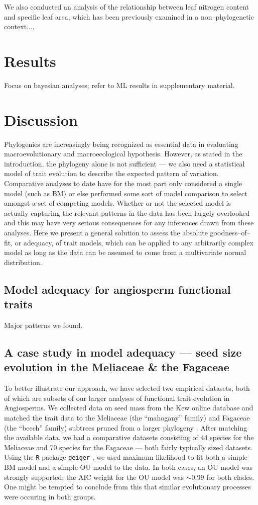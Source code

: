 \documentclass[a4paper,12pt]{article}
\begin{document}
We also conducted an analysis of the relationship between leaf nitrogen content and specific leaf area, which has been previously examined in a non--phylogenetic context....

\section*{Results}

Focus on bayesian analyses; refer to ML results in supplementary material.

\section*{Discussion}

Phylogenies are increasingly being recognized as essential data in evaluating macroevolutionary and macroecological hypothesis. However, as stated in the introduction, the phylogeny alone is not sufficient --- we also need a statistical model of trait evolution to describe the expected pattern of variation. Comparative analyses to date have for the most part only considered a single model (such as BM) or else performed some sort of model comparison to select amongst a set of competing models. Whether or not the selected model is actually capturing the relevant patterns in the data has been largely overlooked and this may have very serious consequences for any inferences drawn from these analyses. Here we present a general solution to assess the absolute goodness--of--fit, or adequacy, of trait models, which can be applied to any arbitrarily complex model as long as the data can be assumed to come from a multivariate normal distribution.

\subsection{Model adequacy for angiosperm functional traits}
Major patterns we found.

\subsection*{A case study in model adequacy --- seed size evolution in the Meliaceae \& the Fagaceae}
To better illustrate our approach, we have selected two empirical datasets, both of which are subsets of our larger analyses of functional trait evolution in Angiosperms. We collected data on seed mass from the Kew online database \citep{Kew2008} and matched the trait data to the Meliaceae (the ``mahogany'' family) and Fagaceae (the ``beech'' family) subtrees pruned from a larger phylogeny \citep{Zanne2013}. After matching the available data, we had a comparative datasets consisting of 44 species for the Meliaceae and 70 species for the Fagaceae --- both fairly typically sized datasets.  Using the \texttt{R} package \texttt{geiger} \citep{geiger}, we used maximum likelihood to fit both a simple BM model and a simple OU model to the data. In both cases, an OU model was strongly supported; the AIC weight for the OU model was $\sim 0.99$ for both clades. One might be tempted to conclude from this that similar evolutionary processes were occuring in both groups. 
\end{document}
